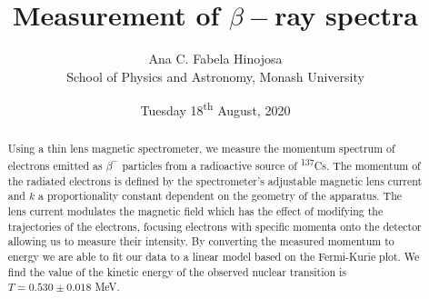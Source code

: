 \documentclass[12pt,a4paper]{article}
\title{Measurement of $\beta-$ray spectra}
\author{Ana C. Fabela Hinojosa\\
\small{School of Physics and Astronomy, Monash University}}
\date{Tuesday 18\textsuperscript{th} August, 2020}
\begin{document}
\maketitle
\begin{abstract}
Using a thin lens magnetic spectrometer, we measure the momentum spectrum of electrons emitted as $\beta^{-}$ particles from a radioactive source of  \textsuperscript{137}Cs. 
The momentum of the radiated electrons is defined by the spectrometer's adjustable magnetic lens current and $k$ a proportionality constant dependent on the geometry of the apparatus. The lens current modulates the magnetic field which has the effect of modifying the trajectories of the electrons, focusing electrons with specific momenta onto the detector allowing us to measure their intensity. By converting the measured momentum to energy we are able to fit our data to a linear model based on the Fermi-Kurie plot. We find the value of the kinetic energy of the observed nuclear transition is $T = 0.530 \pm 0.018$ MeV.
\end{abstract}
\end{document}
